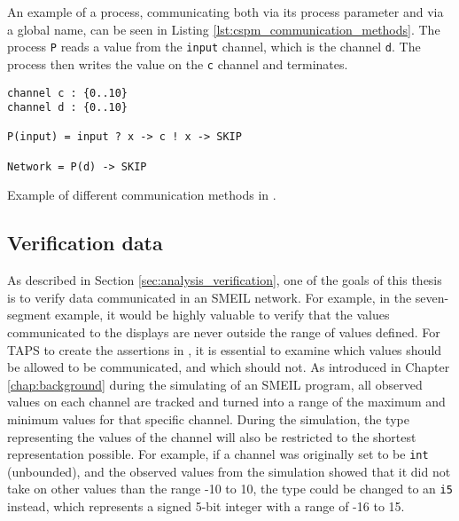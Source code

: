 An example of a \cspm{} process, communicating both via its process parameter and via a global name, can be seen in Listing \ref{lst:cspm_communication_methods}. The process \texttt{P} reads a value from the \texttt{input} channel, which is the channel \texttt{d}. The process then writes the value on the \texttt{c} channel and terminates.
\begin{listing}
\begin{verbatim}
channel c : {0..10}
channel d : {0..10}

P(input) = input ? x -> c ! x -> SKIP

Network = P(d) -> SKIP
\end{verbatim}
\caption{Example of different communication methods in \cspm{}.}
\label{lst:cspm_communication_methods}
\end{listing}
\subsection{Verification data}
As described in Section \ref{sec:analysis_verification}, one of the goals of this thesis is to verify data communicated in an SMEIL network. For example, in the seven-segment example, it would be highly valuable to verify that the values communicated to the displays are never outside the range of values defined. For TAPS to create the assertions in \cspm{}, it is essential to examine which values should be allowed to be communicated, and which should not.
As introduced in Chapter \ref{chap:background} during the simulating of an SMEIL program, all observed values on each channel are tracked and turned into a range of the maximum and minimum values for that specific channel. During the simulation, the type representing the values of the channel will also be restricted to the shortest representation possible. For example, if a channel was originally set to be \texttt{int} (unbounded), and the observed values from the simulation showed that it did not take on other values than the range -10 to 10, the type could be changed to an \texttt{i5} instead, which represents a signed 5-bit integer with a range of -16 to 15.

